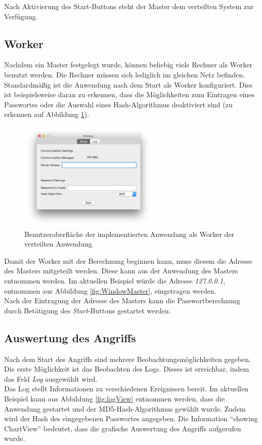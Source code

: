 Nach Aktivierung des Start-Buttons steht der Master dem verteilten System zur Verfügung.   


\subsection{Worker}
\label{WorkerGUI}
Nachdem ein Master festgelegt wurde, können beliebig viele Rechner als Worker benutzt werden. Die Rechner müssen sich lediglich im gleichen Netz befinden. \\
Standardmäßig ist die Anwendung nach dem Start als Worker konfiguriert. Dies ist beispielsweise daran zu erkennen, dass die Möglichkeiten zum Eintragen eines Passwortes oder die Auswahl eines Hash-Algorithmus deaktiviert sind (zu erkennen auf Abbildung \ref{fig:WindowWorker}). \\
\begin{figure}[!ht]
	\centering
		\includegraphics[natwidth=1200pt, natheight=349pt, width=0.6\textwidth]{images/WindowWorker.png}
		\caption{Benutzeroberfläche der implementierten Anwendung als Worker der verteilten Anwendung}
	\label{fig:WindowWorker}
\end{figure}
Damit der Worker mit der Berechnung beginnen kann, muss diesem die Adresse des Masters mitgeteilt werden. Diese kann aus der Anwendung des Masters entnommen werden. Im aktuellen Beispiel würde die Adresse \emph{127.0.0.1}, entnommen aus Abbildung \ref{fig:WindowMaster}, eingetragen werden.\\
Nach der Eintragung der Adresse des Masters kann die Passwortberechnung durch Betätigung des \emph{Start}-Buttons gestartet werden. 



\subsection{Auswertung des Angriffs}
Nach dem Start des Angriffs sind mehrere Beobachtungsmöglichkeiten gegeben. Die erste Möglichkeit ist das Beobachten des Logs. Dieses ist erreichbar, indem das Feld \emph{Log} ausgewählt wird.\\
Das Log stellt Informationen zu verschiedenen Ereignissen bereit. Im aktuellen Beispiel kann aus Abbildung \ref{fig:logView} entnommen werden, dass die Anwendung gestartet und der MD5-Hash-Algorithmus gewählt wurde. Zudem wird der Hash des eingegebenen Passwortes angegeben. Die Information \enquote{showing ChartView} bedeutet, dass die grafische Auswertung des Angriffs aufgerufen wurde.


